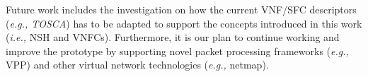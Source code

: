
Future work includes the investigation on how the current VNF/SFC descriptors (\textit{e.g., TOSCA}) has to be adapted to support the concepts introduced in this work (\textit{i.e.,} NSH and VNFCs). Furthermore, it is our plan to continue working and improve the prototype by supporting novel packet processing frameworks (\textit{e.g.,} VPP) and other virtual network technologies (\textit{e.g.,} netmap).





